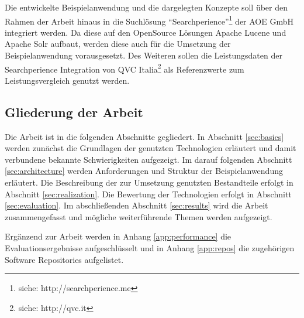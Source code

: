 Die entwickelte Beispielanwendung und die dargelegten Konzepte soll über den Rahmen der Arbeit hinaus in die Suchlösung ``Searchperience''\footnote{siehe: http://searchperience.me} der AOE GmbH integriert werden. Da diese auf den OpenSource Lösungen Apache Lucene und Apache Solr aufbaut, werden diese auch für die Umsetzung der Beispielanwendung vorausgesetzt. Des Weiteren sollen die Leistungsdaten der Searchperience Integration von QVC Italia\footnote{siehe: http://qvc.it} als Referenzwerte zum Leistungsvergleich genutzt werden.

\subsection{Gliederung der Arbeit}

Die Arbeit ist in die folgenden Abschnitte gegliedert. In Abschnitt \ref{sec:basics} werden zunächst die Grundlagen der genutzten Technologien erläutert und damit verbundene bekannte Schwierigkeiten aufgezeigt. Im darauf folgenden Abschnitt \ref{sec:architecture} werden Anforderungen und Struktur der Beispielanwendung erläutert. Die Beschreibung der zur Umsetzung genutzten Bestandteile erfolgt in Abschnitt \ref{sec:realization}. Die Bewertung der Technologien erfolgt in Abschnitt \ref{sec:evaluation}. Im abschließenden Abschnitt \ref{sec:results} wird die Arbeit zusammengefasst und mögliche weiterführende Themen werden aufgezeigt.

Ergänzend zur Arbeit werden in Anhang \ref{app:performance} die Evaluationsergebnisse aufgeschlüsselt und in Anhang \ref{app:repos} die zugehörigen Software Repositories aufgelistet.


